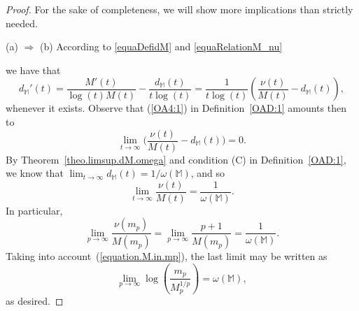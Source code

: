 \documentclass[11pt,a4paper]{article}
\theoremstyle{definition}
\def\oo{\infty}
\def\ri{\rightarrow}
\def\o{\omega}
\def\M{\mathbb{M}}
\begin{document}
\begin{proof}
For the sake of completeness, we will show more implications than strictly needed.\par
 (a) $\Rightarrow$ (b) According to \eqref{equaDefidM} and \eqref{equaRelationM_nu}

 we have that
$$d_{\M}'(t)=\frac{M'(t)}{\log(t)M(t)}-\frac{d_{\M}(t)}{t \log(t)}=
\frac{1}{t\log(t)}\left(\frac{\nu(t)}{M(t)}-d_{\M}(t)\right),$$
whenever it exists.
Observe that (\ref{OA4:1}) in Definition~\ref{OAD:1} amounts then to
\begin{equation}\label{equaRephraseConditionDProxOrder}
\lim_{t\ri \oo} \Big(\frac{\nu(t)}{M(t)} - d_{\M}(t)\Big)=0.
\end{equation}
By Theorem~\ref{theo.limsup.dM.omega} and condition (C) in Definition~\ref{OAD:1}, we know that $\lim_{t\ri\oo} d_{\M}(t) = 1/\o(\M)$, and so
\begin{equation*}
\lim_{t\ri \oo} \frac{\nu(t)}{M(t)}= \frac{1}{\o(\M)}.
\end{equation*}
In particular,
$$
\lim_{p\ri \oo} \frac{\nu(m_p)}{M(m_p)}=\lim_{p\ri \oo} \frac{p+1}{M(m_p)}=\frac{1}{\o(\M)}.
$$
Taking into account~(\ref{equation.M.in.mp}), the last limit may be written as
 \begin{equation*}
  \lim_{p\ri\oo} \log\left(\frac{m_p}{M_p^{1/p}}\right)=\o(\M),
 \end{equation*}
as desired.


\end{proof}
\end{document}
